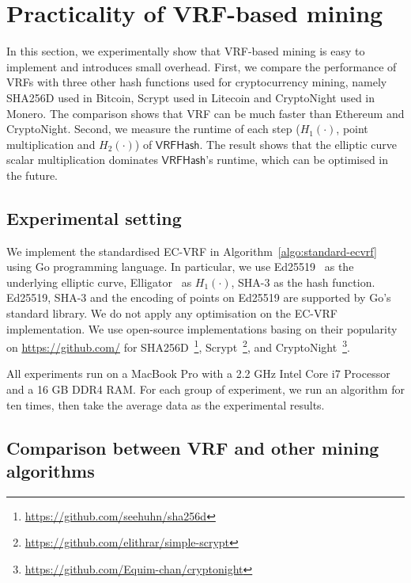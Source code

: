 \section{Practicality of VRF-based mining}
\label{sec:practicality}

In this section, we experimentally show that VRF-based mining is easy to implement and introduces small overhead.
First, we compare the performance of VRFs with three other hash functions used for cryptocurrency mining, namely SHA256D used in Bitcoin, Scrypt used in Litecoin and CryptoNight used in Monero.
The comparison shows that VRF can be much faster than Ethereum and CryptoNight.
Second, we measure the runtime of each step ($H_1(\cdot)$, point multiplication and $H_2(\cdot)$) of $\mathsf{VRFHash}$.
The result shows that the elliptic curve scalar multiplication dominates $\mathsf{VRFHash}$'s runtime, which can be optimised in the future.

\subsection{Experimental setting}

We implement the standardised EC-VRF in Algorithm~\ref{algo:standard-ecvrf} using Go programming language.
In particular, we use Ed25519~\cite{bernstein2012high} as the underlying elliptic curve, Elligator~\cite{bernstein2013elligator} as $H_1(\cdot)$, SHA-3 as the hash function.
Ed25519, SHA-3 and the encoding of points on Ed25519 are supported by Go's standard library.
We do not apply any optimisation on the EC-VRF implementation.
We use open-source implementations basing on their popularity on \url{https://github.com/} for SHA256D~\footnote{\url{https://github.com/seehuhn/sha256d}}, Scrypt~\footnote{\url{https://github.com/elithrar/simple-scrypt}}, and CryptoNight~\footnote{\url{https://github.com/Equim-chan/cryptonight}}.

All experiments run on a MacBook Pro with a 2.2 GHz Intel Core i7 Processor and a 16 GB DDR4 RAM.
For each group of experiment, we run an algorithm for ten times, then take the average data as the experimental results.




\subsection{Comparison between VRF and other mining algorithms}

